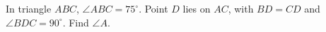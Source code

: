 In triangle $ABC$, $\angle ABC=75^\circ$. Point $D$ lies on $AC$, with $BD=CD$ and $\angle BDC=90^\circ$. Find $\angle A$.
